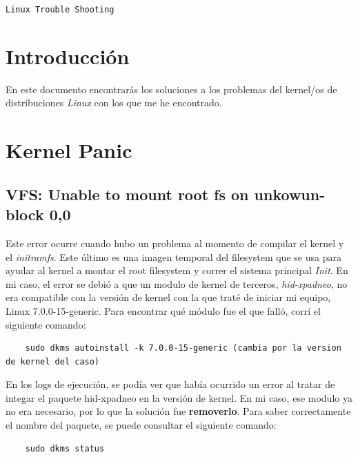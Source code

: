 \documentclass[a4paper,10pt]{article}
\begin{document}
\begin{center}
    {\Large \texttt{Linux Trouble Shooting}}\\
\end{center}

\tableofcontents
\newpage



\section{Introducción}

En este documento encontrarás los soluciones a los problemas del kernel/os de distribuciones \textit{Linux} con los que me he encontrado.



\section{Kernel Panic}


\subsection{VFS: Unable to mount root fs on unkowun-block 0,0}

Este error ocurre cuando hubo un problema al momento de compilar el kernel y el \textit{initramfs}. Este último es una imagen temporal del filesystem que se usa para ayudar al kernel a montar el root filesystem y correr el sistema principal \textit{Init}.
En mi caso, el error se debió a que un modulo de kernel de terceros, \textit{hid-xpadneo},  no era compatible con la versión de kernel con la que traté de iniciar mi equipo, Linux 7.0.0-15-generic.
Para encontrar qué módulo fue el que falló, corrí el siguiente comando:

\begin{lstlisting}
    sudo dkms autoinstall -k 7.0.0-15-generic (cambia por la version de kernel del caso)
\end{lstlisting}

En los logs de ejecución, se podía ver que había ocurrido un error al tratar de integar el paquete hid-xpadneo en la versión de kernel. En mi caso, ese modulo ya no era necesario, por lo que la solución fue \textbf{removerlo}.
Para saber correctamente el nombre del paquete, se puede consultar el siguiente comando:



\begin{lstlisting}
    sudo dkms status
\end{lstlisting}
\end{document}
